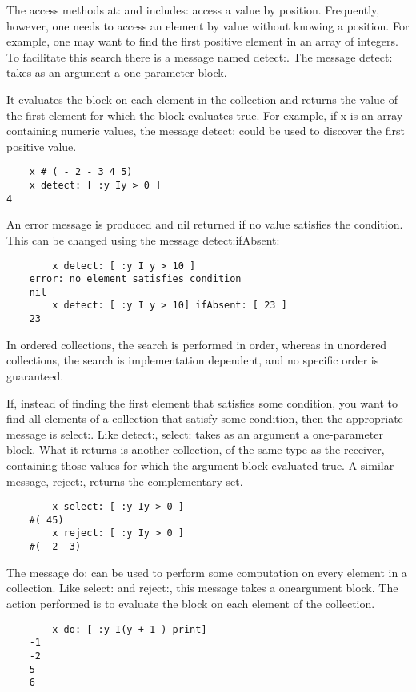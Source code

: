 The access methods at: and includes: access a value by position. Frequently, however, one needs to access an element by value without knowing
a position. For example, one may want to find the first positive element
in an array of integers. To facilitate this search there is a message named
detect:. The message detect: takes as an argument a one-parameter block.

It evaluates the block on each element in the collection and returns
the value of the first element for which the block evaluates true. For example, if x is an array containing numeric values, the message detect: could
be used to discover the first positive value.
\begin{lstlisting}
    x # ( - 2 - 3 4 5)
    x detect: [ :y Iy > 0 ]
4
\end{lstlisting}

An error message is produced and nil returned if no value satisfies the
condition. This can be changed using the message detect:ifAbsent:
\begin{lstlisting}
        x detect: [ :y I y > 10 ]
    error: no element satisfies condition
    nil
        x detect: [ :y I y > 10] ifAbsent: [ 23 ]
    23
\end{lstlisting}

In ordered collections, the search is performed in order, whereas in
unordered collections, the search is implementation dependent, and no
specific order is guaranteed.

If, instead of finding the first element that satisfies some condition,
you want to find all elements of a collection that satisfy some condition,
then the appropriate message is select:. Like detect:, select: takes as an
argument a one-parameter block. What it returns is another collection, of
the same type as the receiver, containing those values for which the argument block evaluated true. A similar message, reject:, returns the complementary set.
\begin{lstlisting}
        x select: [ :y Iy > 0 ]
    #( 45)
        x reject: [ :y Iy > 0 ]
    #( -2 -3)
\end{lstlisting}

The message do: can be used to perform some computation on every
element in a collection. Like select: and reject:, this message takes a oneargument block. The action performed is to evaluate the block on each
element of the collection.
\begin{lstlisting}
        x do: [ :y I(y + 1 ) print]
    -1
    -2
    5
    6
\end{lstlisting}

